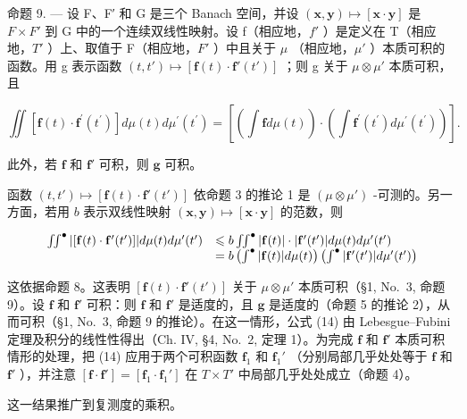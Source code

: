 命题 9. --- 设 F、F′ 和 G 是三个 Banach 空间，并设 \((\mathbf{x},\mathbf{y})\mapsto[\mathbf{x}\cdot\mathbf{y}]\) 是 \(F\times F'\) 到 G 中的一个连续双线性映射。设 f（相应地，\(f'\) ）是定义在 T（相应地，\(T'\) ）上、取值于 F（相应地，\(F'\) ）中且关于 \(\mu\) （相应地，\(\mu'\) ）本质可积的函数。用 g 表示函数 \((t,t')\mapsto[\mathbf{f}(t)\cdot\mathbf{f}'(t')]\) ；则 g 关于 \(\mu\otimes\mu'\) 本质可积，且

\[
\iint \left[ \mathbf {f} (t) \cdot \mathbf {f} ^ {\prime} \left(t ^ {\prime}\right) \right] d \mu (t) d \mu^ {\prime} \left(t ^ {\prime}\right) = \left[ \left(\int \mathbf {f} d \mu (t)\right) \cdot \left(\int \mathbf {f} ^ {\prime} \left(t ^ {\prime}\right) d \mu^ {\prime} \left(t ^ {\prime}\right)\right) \right].\tag{14}
\]

此外，若 \(\mathbf{f}\) 和 \(\mathbf{f}'\) 可积，则 \(\mathbf{g}\) 可积。

函数 \((t, t') \mapsto [\mathbf{f}(t) \cdot \mathbf{f}'(t')]\) 依命题 3 的推论 1 是 \((\mu \otimes \mu')\) -可测的。另一方面，若用 \(b\) 表示双线性映射 \((\mathbf{x}, \mathbf{y}) \mapsto [\mathbf{x} \cdot \mathbf{y}]\) 的范数，则

\[
\begin{array}{r l} \iint^ {\bullet} | [ \mathbf {f} (t) \cdot \mathbf {f} ^ {\prime} (t ^ {\prime}) ] | d \mu (t) d \mu^ {\prime} (t ^ {\prime}) & \leqslant b \iint^ {\bullet} | \mathbf {f} (t) | \cdot | \mathbf {f} ^ {\prime} (t ^ {\prime}) | d \mu (t) d \mu^ {\prime} (t ^ {\prime}) \\ & = b \left(\int^ {\bullet} | \mathbf {f} (t) | d \mu (t)\right) \left(\int^ {\bullet} | \mathbf {f} ^ {\prime} (t ^ {\prime}) | d \mu^ {\prime} (t ^ {\prime})\right) \end{array}
\]

这依据命题 8。这表明 \([\mathbf{f}(t) \cdot \mathbf{f}'(t')]\) 关于 \(\mu \otimes \mu'\) 本质可积（§1, No.~3, 命题 9）。设 \(\mathbf{f}\) 和 \(\mathbf{f}'\) 可积：则 \(\mathbf{f}\) 和 \(\mathbf{f}'\) 是适度的，且 \(\mathbf{g}\) 是适度的（命题 5 的推论 2），从而可积（§1, No.~3, 命题 9 的推论）。在这一情形，公式 (14) 由 Lebesgue--Fubini 定理及积分的线性性得出（Ch. IV, §4, No.~2, 定理 1）。为完成 \(\mathbf{f}\) 和 \(\mathbf{f}'\) 本质可积情形的处理，把 (14) 应用于两个可积函数 \(\mathbf{f}_1\) 和 \(\mathbf{f}_1'\) （分别局部几乎处处等于 \(\mathbf{f}\) 和 \(\mathbf{f}'\) ），并注意 \([\mathbf{f} \cdot \mathbf{f}'] = [\mathbf{f}_1 \cdot \mathbf{f}_1']\) 在 \(T \times T'\) 中局部几乎处处成立（命题 4）。

这一结果推广到复测度的乘积。

